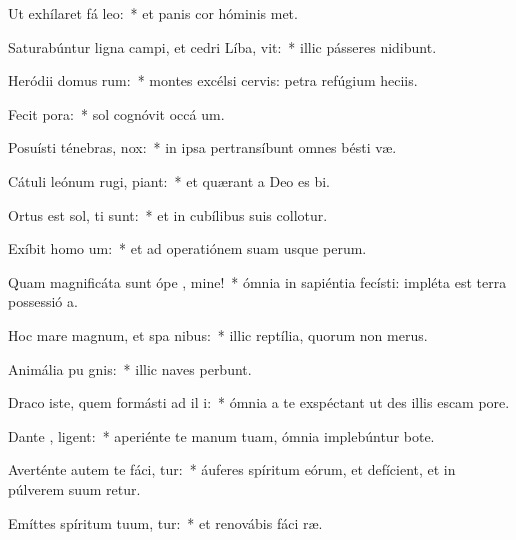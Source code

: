 \item Ut exhílaret fá  leo:~* et panis cor hóminis met.
\item Saturabúntur ligna campi, et cedri Líba,  vit:~* illic pásseres nidibunt.
\item Heródii domus   rum:~* montes excélsi cervis: petra refúgium heciis.
\item Fecit   pora:~* sol cognóvit occá um.
\item Posuísti ténebras,    nox:~* in ipsa pertransíbunt omnes bésti væ.
\item Cátuli leónum rugi,  piant:~* et quærant a Deo es bi.
\item Ortus est sol,  ti sunt:~* et in cubílibus suis collotur.
\item Exíbit homo   um:~* et ad operatiónem suam usque  perum.
\item Quam magnificáta sunt ópe , mine!~* ómnia in sapiéntia fecísti: impléta est terra possessió a.
\item Hoc mare magnum, et spa nibus:~* illic reptília, quorum non  merus.
\item Animália pu  gnis:~* illic naves perbunt.
\item Draco iste, quem formásti ad il i:~* ómnia a te exspéctant ut des illis escam  pore.
\item Dante  , ligent:~* aperiénte te manum tuam, ómnia implebúntur bote.
\item Averténte autem te fáci, tur:~* áuferes spíritum eórum, et defícient, et in púlverem suum retur.
\item Emíttes spíritum tuum,  tur:~* et renovábis fáci ræ.
